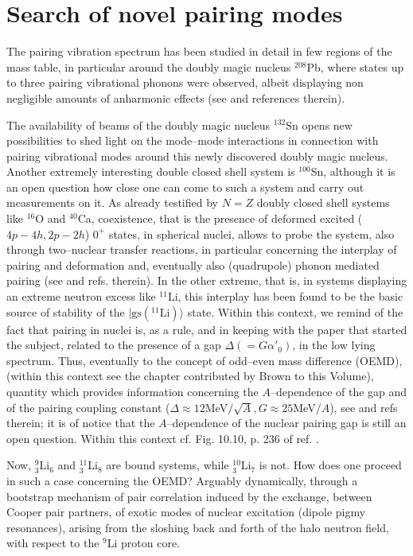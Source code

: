 \documentclass[a4paper,14pt]{book}
\begin{document}
\section{Search of novel pairing modes}
The pairing vibration spectrum has been studied in detail in few regions of the mass table, in particular around the doubly magic nucleus $^{208}$Pb, where states up to three pairing vibrational phonons were observed, albeit displaying non negligible amounts of anharmonic effects (see \cite{Flynn:72} and references therein).


The availability of beams of the doubly magic nucleus $^{132}$Sn opens new possibilities to shed light on the mode--mode interactions in connection with pairing vibrational modes around this newly discovered doubly magic nucleus\cite{Jones:10}. Another extremely interesting double closed shell system is $^{100}$Sn, although it is an open question how close one can come to such a system and carry out measurements on it. As already testified by $N=Z$ doubly closed shell systems like $^{16}$O and $^{40}$Ca, coexistence, that is the presence of deformed excited ($4p-4h,2p-2h$) $0^+$ states, in spherical nuclei, allows to probe the system, also through two--nuclear transfer reactions, in particular concerning the interplay of pairing and deformation and, eventually also (quadrupole) phonon mediated pairing (see \cite{Broglia:73} and refs. therein). In the other extreme, that is, in systems displaying an extreme neutron excess like $^{11}$Li, this interplay has been found to be the basic source of stability of the $|\text{gs}(^{11}\text{Li})\rangle$ state. 
Within this context, we remind of the fact that pairing in nuclei is, as a rule, and in keeping with the paper that started the subject\cite{Bohr:58}, related to the presence of a gap $\Delta(=G\alpha'_0)$, in the low lying spectrum. Thus, eventually to the concept of odd--even mass difference (OEMD), (within this context see the chapter contributed by Brown to this Volume), quantity which provides information concerning  the $A$--dependence of the gap and of the pairing coupling constant ($\Delta\approx 12$MeV$/\sqrt{A}, G\approx 25$MeV$/A$), see \cite{Bohr:75,Bohr:69} and refs therein; it is of notice that the $A$--dependence of the nuclear pairing gap is still an open question. Within this context cf. Fig. 10.10, p. 236 of ref. \cite{Brink:05}.


Now, $^9_3$Li$_6$ and  $^{11}_3$Li$_8$ are bound systems, while  $^{10}_3$Li$_7$ is not. How does one proceed in such a case concerning the OEMD? Arguably dynamically, through a bootstrap mechanism of pair correlation induced by the exchange, between Cooper pair partners, of exotic modes of nuclear excitation (dipole pigmy resonances), arising from the sloshing back and forth of the halo neutron field, with respect to the  $^9$Li proton core.
\end{document}
